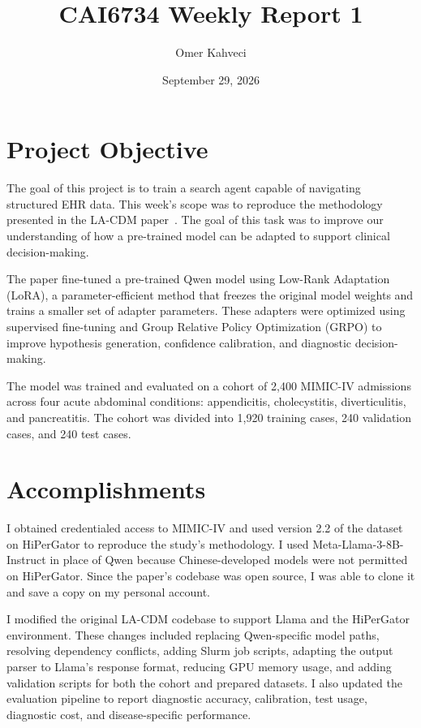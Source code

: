 \documentclass[11pt]{article}
\title{CAI6734 Weekly Report 1}
\author{Omer Kahveci}
\date{September 29, 2026}
\begin{document}
\maketitle

\section{Project Objective}
The goal of this project is to train a search agent capable of navigating structured EHR data. This week's scope was 
to reproduce the methodology presented in the LA-CDM paper~\cite{baniharouni2025language}. The goal of this task was to 
improve our understanding of how a pre-trained model can be adapted to support clinical decision-making.

The paper fine-tuned a pre-trained Qwen model using Low-Rank Adaptation (LoRA), a parameter-efficient method that
freezes the original model weights and trains a smaller set of adapter parameters. These adapters were optimized
using supervised fine-tuning and Group Relative Policy Optimization (GRPO) to improve hypothesis generation,
confidence calibration, and diagnostic decision-making.

The model was trained and evaluated on a cohort of 2,400 MIMIC-IV admissions across four acute abdominal conditions: 
appendicitis, cholecystitis, diverticulitis, and pancreatitis. The cohort was divided into 1,920 training cases, 240 
validation cases, and 240 test cases.

\section{Accomplishments}

I obtained credentialed access to MIMIC-IV and used version 2.2 of the dataset on HiPerGator to reproduce the study's 
methodology. I used Meta-Llama-3-8B-Instruct in place of Qwen because Chinese-developed models were not permitted on 
HiPerGator. Since the paper's codebase was open source, I was able to clone it and save a copy on my personal account.

I modified the original LA-CDM codebase to support Llama and the HiPerGator environment. These changes included 
replacing Qwen-specific model paths, resolving dependency conflicts, adding Slurm job scripts, adapting the output
parser to Llama's response format, reducing GPU memory usage, and adding validation scripts for both the cohort and 
prepared datasets. I also updated the evaluation pipeline to report diagnostic accuracy, calibration, test usage,
diagnostic cost, and disease-specific performance.
\end{document}
